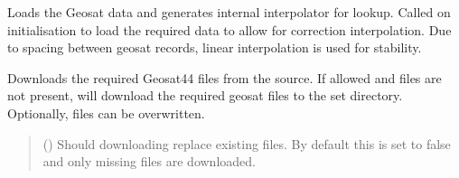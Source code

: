 \documentclass[letterpaper,10pt,english]{sphinxmanual}
\begin{document}
\begin{fulllineitems}
\begin{fulllineitems}
\label{\detokenize{modules/gravity/geosat:qnav.gravity.geosat.Geosat44.load_data}}
\pysigstartsignatures
{}
\pysigstopsignatures
\sphinxAtStartPar
Loads the Geosat data and generates internal interpolator for look\sphinxhyphen{}up.
Called on initialisation to load the required data to allow for
correction interpolation. Due to spacing between geosat records,
linear interpolation is used for stability.

\end{fulllineitems}


\begin{fulllineitems}
\label{\detokenize{modules/gravity/geosat:qnav.gravity.geosat.Geosat44.download_data}}
\pysigstartsignatures
{}
\pysigstopsignatures
\sphinxAtStartPar
Downloads the required Geosat\sphinxhyphen{}44 files from the source.
If allowed and files are not present, will download the required
geosat files to the set directory. Optionally, files can be
overwritten.
\begin{quote}\begin{description}
\sphinxAtStartPar
{} () \textendash{} Should downloading replace existing files.
By default this is set to false and only missing files
are downloaded.

\end{description}\end{quote}

\end{fulllineitems}


\end{fulllineitems}

\end{document}
